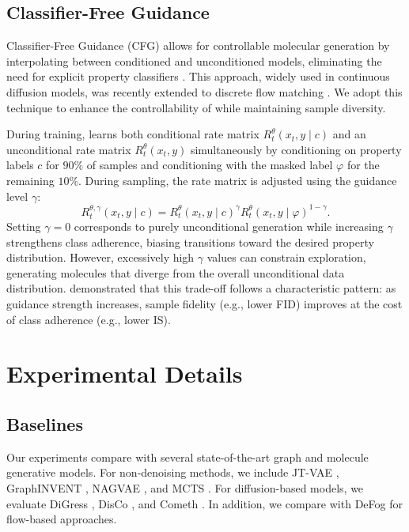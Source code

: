 \subsection{Classifier-Free Guidance}
\label{appsubsec:classifier-free_guidance}

Classifier-Free Guidance (CFG) allows for controllable molecular generation by interpolating between conditioned and unconditioned models, eliminating the need for explicit property classifiers \citep{classifier_free_guidance}. 
This approach, widely used in continuous diffusion models, was recently extended to discrete flow matching \citep{unlocking_guidance_dfm}. 
We adopt this technique to enhance the controllability of \methodname{} while maintaining sample diversity.

During training, \methodname{} learns both conditional rate matrix $R^\theta_t(x_t, y \mid c)$ and an unconditional rate matrix $R^\theta_t(x_t, y)$ simultaneously by conditioning on property labels $c$ for $90\%$ of samples and conditioning with the masked label $\varphi$ for the remaining $10\%$. 
During sampling, the rate matrix is adjusted using the guidance level $\gamma$:
\begin{equation}
    R^{\theta, \gamma}_t(x_t, y \mid c) = 
    R^\theta_t(x_t, y \mid c)^\gamma 
    R^\theta_t(x_t, y \mid \varphi)^{1-\gamma}.
    \label{eq:cfg_guidance}
\end{equation}
Setting $\gamma=0$ corresponds to purely unconditional generation while increasing $\gamma$ strengthens class adherence, biasing transitions toward the desired property distribution. However, excessively high $\gamma$ values can constrain exploration, generating molecules that diverge from the overall unconditional data distribution. 
\citet{classifier_free_guidance} demonstrated that this trade-off follows a characteristic pattern: as guidance strength increases, sample fidelity (e.g., lower FID) improves at the cost of class adherence (e.g., lower IS).


\section{Experimental Details}
\label{appsec:experimental_details}


\subsection{Baselines}
\label{subsec:baselines}

Our experiments compare \methodname{} with several state-of-the-art graph and molecule generative models. For non-denoising methods, we include JT-VAE \citep{jtvae}, GraphINVENT \citep{graphinvent}, NAGVAE \citep{nagvae}, and MCTS \citep{mcts_molecule}. For diffusion-based models, we evaluate DiGress \citep{digress}, DisCo \citep{disco}, and Cometh \citep{cometh}. In addition, we compare with DeFog \citep{defog} for flow-based approaches.


